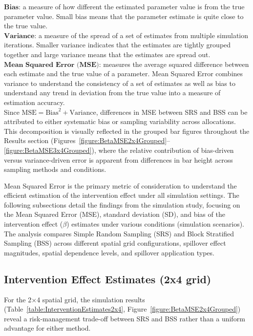 \documentclass{article}[11pt]
\begin{document}
\noindent $\textbf{Bias}$: a measure of how different the estimated parameter value is from the true parameter value. Small bias means that the parameter estimate is quite close to the true value.\\

\noindent $\textbf{Variance}$: a measure of the spread of a set of estimates from multiple simulation iterations. Smaller variance indicates that the estimates are tightly grouped together and large variance means that the estimates are spread out.\\

\noindent $\textbf{Mean Squared Error (MSE)}$: measures the average squared difference between each estimate and the true value of a parameter. Mean Squared Error combines variance to understand the consistency of a set of estimates as well as bias to understand any trend in deviation from the true value into a measure of estimation accuracy.\\

Since $\text{MSE} = \text{Bias}^2 + \text{Variance}$, differences in MSE between SRS and BSS can be attributed to either systematic bias or sampling variability across allocations. This decomposition is visually reflected in the grouped bar figures throughout the Results section (Figures~\ref{figure:BetaMSE2x4Grouped}--\ref{figure:BetaMSE3x4Grouped}), where the relative contribution of bias-driven versus variance-driven error is apparent from differences in bar height across sampling methods and conditions.

Mean Squared Error is the primary metric of consideration to understand the efficient estimation of the intervention effect under all simulation settings. The following subsections detail the findings from the simulation study, focusing on the Mean Squared Error (MSE), standard deviation (SD), and bias of the intervention effect ($\beta$) estimates under various conditions (simulation scenarios). The analysis compares Simple Random Sampling (SRS) and Block Stratified Sampling (BSS) across different spatial grid configurations, spillover effect magnitudes, spatial dependence levels, and spillover application types.

\subsection{Intervention Effect Estimates (2x4 grid)}

For the 2$\times$4 spatial grid, the simulation results (Table~\ref{table:InterventionEstimates2x4}, Figure~\ref{figure:BetaMSE2x4Grouped}) reveal a risk-management trade-off between SRS and BSS rather than a uniform advantage for either method.
\end{document}
